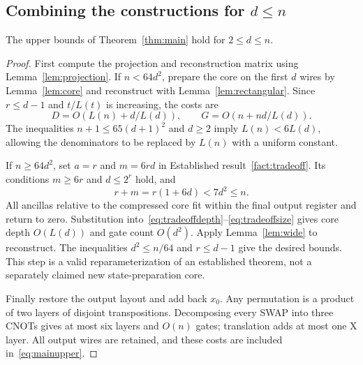 \subsection{Combining the constructions for \texorpdfstring{$d\le n$}{d <= n}}
\begin{proposition}\label{prop:small}
The upper bounds of Theorem~\ref{thm:main} hold for $2\le d\le n$.
\end{proposition}
\begin{proof}
First compute the projection and reconstruction matrix using Lemma~\ref{lem:projection}. If $n<64d^2$, prepare the core on the first $d$ wires by Lemma~\ref{lem:core} and reconstruct with Lemma~\ref{lem:rectangular}. Since $r\le d-1$ and $t/L(t)$ is increasing, the costs are
\[
D=O(L(n)+d/L(d)),\qquad G=O(n+nd/L(d)).
\]
The inequalities $n+1\le65(d+1)^2$ and $d\ge2$ imply $L(n)<6L(d)$, allowing the denominators to be replaced by $L(n)$ with a uniform constant.

If $n\ge64d^2$, set $a=r$ and $m=6rd$ in Established result~\ref{fact:tradeoff}. Its conditions $m\ge6r$ and $d\le2^r$ hold, and
\[
r+m=r(1+6d)<7d^2\le n.
\]
All ancillas relative to the compressed core fit within the final output register and return to zero. Substitution into~\eqref{eq:tradeoffdepth}--\eqref{eq:tradeoffsize} gives core depth $O(L(d))$ and gate count $O(d^2)$. Apply Lemma~\ref{lem:wide} to reconstruct. The inequalities $d^2\le n/64$ and $r\le d-1$ give the desired bounds. This step is a valid reparameterization of an established theorem, not a separately claimed new state-preparation core.

Finally restore the output layout and add back $x_0$. Any permutation is a product of two layers of disjoint transpositions. Decomposing every SWAP into three CNOTs gives at most six layers and $O(n)$ gates; translation adds at most one X layer. All output wires are retained, and these costs are included in~\eqref{eq:mainupper}.
\end{proof}
